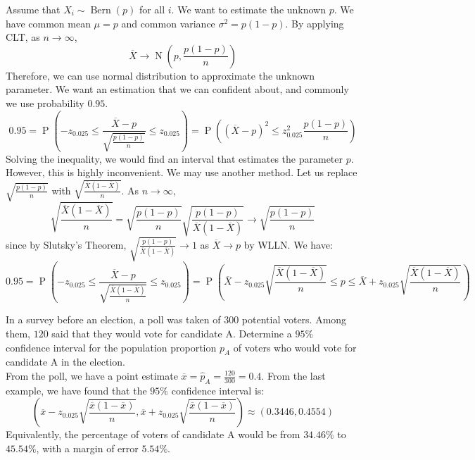 \documentclass{huhtakm-template-book-v2}
\DeclareMathOperator{\prob}{P}
\DeclareMathOperator{\Bern}{Bern}
\DeclareMathOperator{\N}{N}
\begin{document}
\begin{eg}
	Assume that $X_{i}\sim\Bern(p)$ for all $i$. We want to estimate the unknown $p$. We have common mean $\mu=p$ and common variance $\sigma^{2}=p(1-p)$. By applying CLT, as $n\to\infty$,
	\begin{equation*}
		\overline{X}\to\N\left(p,\frac{p(1-p)}{n}\right)
	\end{equation*}
	Therefore, we can use normal distribution to approximate the unknown parameter. We want an estimation that we can confident about, and commonly we use probability $0.95$.
	\begin{equation*}
		0.95=\prob\left(-z_{0.025}\leq\frac{\overline{X}-p}{\sqrt{\frac{p(1-p)}{n}}}\leq z_{0.025}\right)=\prob\left((\overline{X}-p)^{2}\leq z_{0.025}^{2}\frac{p(1-p)}{n}\right)
	\end{equation*} 
	Solving the inequality, we would find an interval that estimates the parameter $p$. However, this is highly inconvenient. We may use another method. Let us replace $\sqrt{\frac{p(1-p)}{n}}$ with $\sqrt{\frac{\overline{X}(1-\overline{X})}{n}}$. As $n\to\infty$,
	\begin{equation*}
		\sqrt{\frac{\overline{X}(1-\overline{X})}{n}}=\sqrt{\frac{p(1-p)}{n}}\sqrt{\frac{p(1-p)}{\overline{X}(1-\overline{X})}}\to\sqrt{\frac{p(1-p)}{n}}
	\end{equation*}
	since by Slutsky's Theorem, $\sqrt{\frac{p(1-p)}{\overline{X}(1-\overline{X})}}\to 1$ as $\overline{X}\to p$ by WLLN. We have:
	\begin{equation*}
		0.95=\prob\left(-z_{0.025}\leq\frac{\overline{X}-p}{\sqrt{\frac{\overline{X}(1-\overline{X})}{n}}}\leq z_{0.025}\right)=\prob\left(\overline{X}-z_{0.025}\sqrt{\frac{\overline{X}(1-\overline{X})}{n}}\leq p\leq\overline{X}+z_{0.025}\sqrt{\frac{\overline{X}(1-\overline{X})}{n}}\right)
	\end{equation*} 
\end{eg}
\begin{eg}
	In a survey before an election, a poll was taken of $300$ potential voters. Among them, $120$ said that they would vote for candidate A. Determine a $95\%$ confidence interval for the population proportion $p_{A}$ of voters who would vote for candidate A in the election.\\
	From the poll, we have a point estimate $\overline{x}=\hat{p}_{A}=\frac{120}{300}=0.4$. From the last example, we have found that the $95\%$ confidence interval is:
	\begin{equation*}
		\left(\overline{x}-z_{0.025}\sqrt{\frac{\overline{x}(1-\overline{x})}{n}},\overline{x}+z_{0.025}\sqrt{\frac{\overline{x}(1-\overline{x})}{n}}\right)\approx(0.3446,0.4554)
	\end{equation*}
	Equivalently, the percentage of voters of candidate A would be from $34.46\%$ to $45.54\%$, with a margin of error $5.54\%$.
\end{eg}
\end{document}
